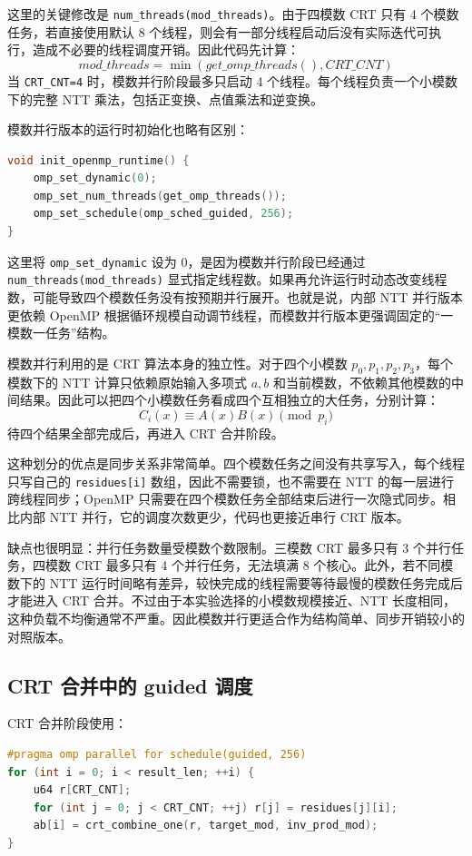\documentclass[a4paper]{article}
\begin{document}
这里的关键修改是 \texttt{num\_threads(mod\_threads)}。由于四模数 CRT 只有 4 个模数任务，若直接使用默认 8 个线程，则会有一部分线程启动后没有实际迭代可执行，造成不必要的线程调度开销。因此代码先计算：
\[
mod\_threads=\min(get\_omp\_threads(),CRT\_CNT)
\]
当 \texttt{CRT\_CNT=4} 时，模数并行阶段最多只启动 4 个线程。每个线程负责一个小模数下的完整 NTT 乘法，包括正变换、点值乘法和逆变换。

模数并行版本的运行时初始化也略有区别：

\begin{lstlisting}[title=模数并行版本的 OpenMP 初始化,frame=trbl,language={C++}]
void init_openmp_runtime() {
    omp_set_dynamic(0);
    omp_set_num_threads(get_omp_threads());
    omp_set_schedule(omp_sched_guided, 256);
}
\end{lstlisting}

这里将 \texttt{omp\_set\_dynamic} 设为 0，是因为模数并行阶段已经通过 \texttt{num\_threads(mod\_threads)} 显式指定线程数。如果再允许运行时动态改变线程数，可能导致四个模数任务没有按预期并行展开。也就是说，内部 NTT 并行版本更依赖 OpenMP 根据循环规模自动调节线程，而模数并行版本更强调固定的“一模数一任务”结构。

模数并行利用的是 CRT 算法本身的独立性。对于四个小模数 $p_0,p_1,p_2,p_3$，每个模数下的 NTT 计算只依赖原始输入多项式 $a,b$ 和当前模数，不依赖其他模数的中间结果。因此可以把四个小模数任务看成四个互相独立的大任务，分别计算：
\[
C_i(x)\equiv A(x)B(x)\pmod {p_i}
\]
待四个结果全部完成后，再进入 CRT 合并阶段。

这种划分的优点是同步关系非常简单。四个模数任务之间没有共享写入，每个线程只写自己的 \texttt{residues[i]} 数组，因此不需要锁，也不需要在 NTT 的每一层进行跨线程同步；OpenMP 只需要在四个模数任务全部结束后进行一次隐式同步。相比内部 NTT 并行，它的调度次数更少，代码也更接近串行 CRT 版本。

缺点也很明显：并行任务数量受模数个数限制。三模数 CRT 最多只有 3 个并行任务，四模数 CRT 最多只有 4 个并行任务，无法填满 8 个核心。此外，若不同模数下的 NTT 运行时间略有差异，较快完成的线程需要等待最慢的模数任务完成后才能进入 CRT 合并。不过由于本实验选择的小模数规模接近、NTT 长度相同，这种负载不均衡通常不严重。因此模数并行更适合作为结构简单、同步开销较小的对照版本。

\subsection{CRT 合并中的 guided 调度}

CRT 合并阶段使用：

\begin{lstlisting}[title=CRT 合并 guided 调度,frame=trbl,language={C++}]
#pragma omp parallel for schedule(guided, 256)
for (int i = 0; i < result_len; ++i) {
    u64 r[CRT_CNT];
    for (int j = 0; j < CRT_CNT; ++j) r[j] = residues[j][i];
    ab[i] = crt_combine_one(r, target_mod, inv_prod_mod);
}
\end{lstlisting}
\end{document}
